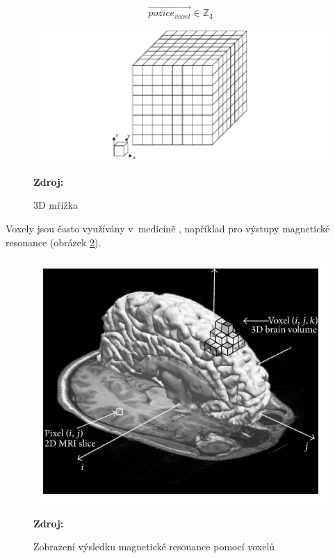 \begin{equation} \label{eq:voxel_coords}
	\begin{gathered}
		\vec{pozice_{voxel}} \in \mathbb{Z}_3
	\end{gathered}
\end{equation}

\begin{figure}[H]
	\centering
	\includegraphics[scale=0.5]{obrazky-figures/3d_grid.png}
	\caption{3D mřížka}
	\textbf{Zdroj: }\cite{3d_grid_image}
	\label{fig:3d_grid}
\end{figure}

Voxely jsou často využívány v~medicíně \cite{medical_vox}, například pro výstupy magnetické resonance (obrázek \ref{fig:mri_vox}).

\begin{figure}[H]
	\centering
	\includegraphics[scale=1]{obrazky-figures/voxel_mri.png}
	\caption{Zobrazení výsledku magnetické resonance pomocí voxelů}
	\textbf{Zdroj: \cite{mri}}
	\label{fig:mri_vox}
\end{figure}

